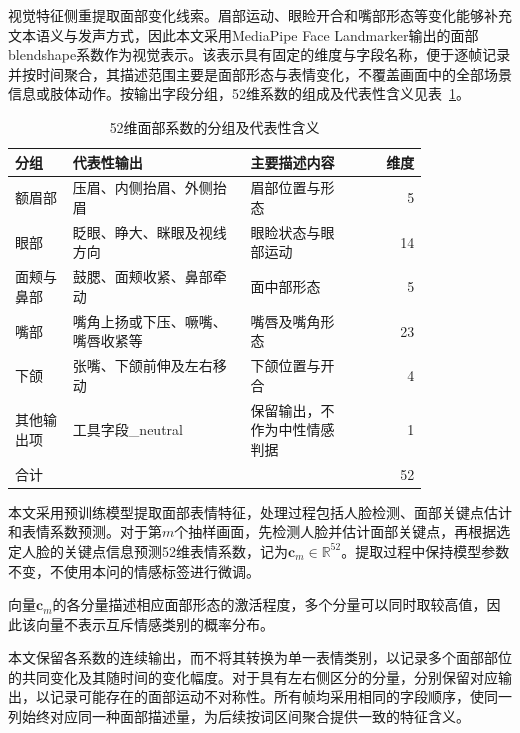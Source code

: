 视觉特征侧重提取面部变化线索。眉部运动、眼睑开合和嘴部形态等变化能够补充文本语义与发声方式，因此本文采用MediaPipe Face Landmarker输出的面部blendshape系数作为视觉表示。该表示具有固定的维度与字段名称，便于逐帧记录并按时间聚合，其描述范围主要是面部形态与表情变化，不覆盖画面中的全部场景信息或肢体动作。按输出字段分组，52维系数的组成及代表性含义见表~\ref{tab:p1_visual_groups}。

\begin{table}[htbp]
    \centering
    \caption{52维面部系数的分组及代表性含义}
    \label{tab:p1_visual_groups}
    \begingroup
    \small
    \renewcommand{\arraystretch}{1.2}
    \begin{tabular}{@{}p{0.14\linewidth}p{0.43\linewidth}p{0.25\linewidth}r@{}}
        \hline
        分组 & 代表性输出 & 主要描述内容 & 维度\\
        \hline
        额眉部 & 压眉、内侧抬眉、外侧抬眉
        & 眉部位置与形态 & 5\\
        眼部 & 眨眼、睁大、眯眼及视线方向
        & 眼睑状态与眼部运动 & 14\\
        面颊与鼻部 & 鼓腮、面颊收紧、鼻部牵动
        & 面中部形态 & 5\\
        嘴部 & 嘴角上扬或下压、噘嘴、嘴唇收紧等
        & 嘴唇及嘴角形态 & 23\\
        下颌 & 张嘴、下颌前伸及左右移动
        & 下颌位置与开合 & 4\\
        其他输出项 & 工具字段\_neutral
        & 保留输出，不作为中性情感判据 & 1\\
        \hline
        合计 & & & 52\\
        \hline
    \end{tabular}
    \endgroup
\end{table}

本文采用预训练模型提取面部表情特征，处理过程包括人脸检测、面部关键点估计和表情系数预测。对于第$m$个抽样画面，先检测人脸并估计面部关键点，再根据选定人脸的关键点信息预测52维表情系数，记为$\boldsymbol{c}_m\in\mathbb{R}^{52}$。提取过程中保持模型参数不变，不使用本问的情感标签进行微调。

向量$\boldsymbol{c}_m$的各分量描述相应面部形态的激活程度，多个分量可以同时取较高值，因此该向量不表示互斥情感类别的概率分布。

本文保留各系数的连续输出，而不将其转换为单一表情类别，以记录多个面部部位的共同变化及其随时间的变化幅度。对于具有左右侧区分的分量，分别保留对应输出，以记录可能存在的面部运动不对称性。所有帧均采用相同的字段顺序，使同一列始终对应同一种面部描述量，为后续按词区间聚合提供一致的特征含义。

